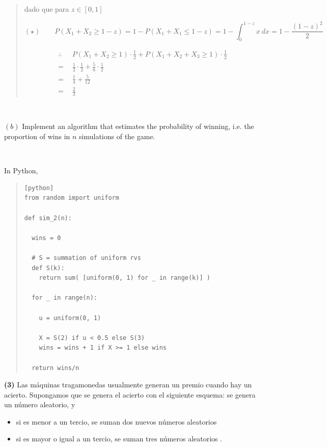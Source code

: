 \documentclass[a4paper, 12pt]{article}
\begin{document}
\begin{quote}
dado que para $z \in [0, 1]$

\begin{equation*}
  ( \star ) \qquad P(X_1 + X_2 \geq 1 - z) = 1 - P(X_1 + X_1 \leq 1 - z) = 1 - \int_0^{1-z} x ~ dx = 1 - \frac{ (1-z)^2 }{2}
\end{equation*}

\begin{align*}
  \therefore  ~ ~ ~
  &P(X_1 + X_2 \geq 1)\cdot \frac{1}{2} + P(X_1 + X_2 + X_3 \geq
  1)\cdot \frac{1}{2} \\
  = &\frac{1}{2} \cdot \frac{1}{2} + \frac{5}{6} \cdot
  \frac{1}{2}  \\
  = &\frac{1}{4} + \frac{5}{12} \\
  =&\frac{2}{3}
\end{align*}

\end{quote}
\normalsize


~

$(b)$ Implement an algorithm that estimates the probability of winning, i.e. the
proportion of wins in $n$ simulations of the game.

~ 

In Python, 




\tiny
\begin{quote}

\begin{verbatim}[python]
from random import uniform

def sim_2(n):

  wins = 0

  # S = summation of uniform rvs
  def S(k):
    return sum( [uniform(0, 1) for _ in range(k)] )

  for _ in range(n):

    u = uniform(0, 1)
 
    X = S(2) if u < 0.5 else S(3)
    wins = wins + 1 if X >= 1 else wins

  return wins/n
\end{verbatim}




\end{quote}
\normalsize
\pagebreak 

\textbf{(3)} Las máquinas tragamonedas usualmente generan un premio cuando hay un acierto. Supongamos que se genera el acierto con el siguiente esquema: se genera un número aleatorio, y

\begin{itemize}
\item si es menor a un tercio, se suman dos nuevos números aleatorios
\item si es mayor o igual a un tercio, se suman tres números aleatorios .
\end{itemize}
\end{document}
